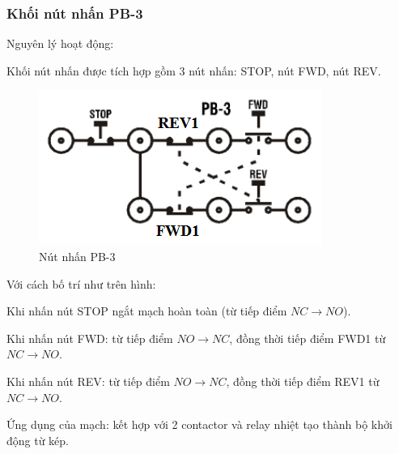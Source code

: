 \documentclass[13pt,a4paper]{extarticle}
\begin{document}
\subsubsection{Khối nút nhấn PB-3}
Nguyên lý hoạt động:
\begin{list}{--}{}
\item Khối nút nhấn được tích hợp gồm 3 nút nhấn: STOP, nút FWD, nút REV. 
\begin{figure}[!h]
\begin{center}
\includegraphics[scale=.7]{nut-nhan-3}
\end{center}
\caption{Nút nhấn PB-3}
\end{figure}
\item Với cách bố trí như trên hình:
\begin{list}{+}{}
\item Khi nhấn nút STOP ngắt mạch hoàn toàn (từ tiếp điểm $NC \longrightarrow NO$).
\item Khi nhấn nút FWD: từ tiếp điểm $NO \longrightarrow NC$, đồng thời tiếp điểm FWD1 từ $NC \longrightarrow NO$.
\item Khi nhấn nút REV: từ tiếp điểm $NO \longrightarrow NC$, đồng thời tiếp điểm REV1 từ $NC \longrightarrow NO$.
\end{list}
\item Ứng dụng của mạch: kết hợp với 2 contactor và relay nhiệt tạo thành bộ khởi động từ kép.
\end{list}
\end{document}
